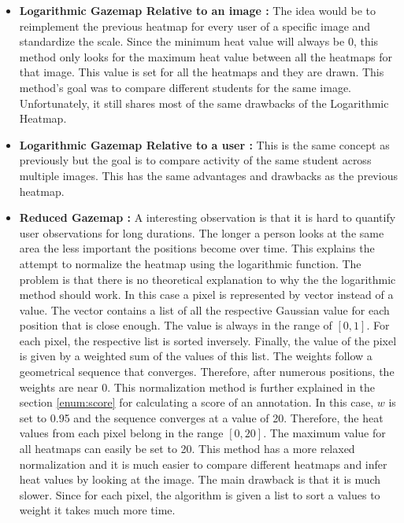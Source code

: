 \documentclass[a4paper,11pt]{report}
\numberwithin{figure}{chapter} %
\begin{document}
\begin{itemize}
\begin{itemize}
            \item \textbf{Logarithmic Gazemap Relative to an image :} The idea would be to reimplement the previous heatmap for every user of a specific image and standardize the scale.
            Since the minimum heat value will always be 0, this method only looks for the maximum heat value between all the heatmaps for that image.
            This value is set for all the heatmaps and they are drawn. This method's goal was to compare different students for the same image.
            Unfortunately, it still shares most of the same drawbacks of the Logarithmic Heatmap.
            \item \textbf{Logarithmic Gazemap Relative to a user :} This is the same concept as previously but the goal is to compare activity of the same student across multiple images.
            This has the same advantages and drawbacks as the previous heatmap.
            \item \textbf{Reduced Gazemap :} A interesting observation is that it is hard to quantify user observations for long durations.
            The longer a person looks at the same area the less important the positions become over time.
            This explains the attempt to normalize the heatmap using the logarithmic function.
            The problem is that there is no theoretical explanation to why the the logarithmic method should work.
            In this case a pixel is represented by vector instead of a value.
            The vector contains a list of all the respective Gaussian value for each position that is close enough.
            The value is always in the range of $[0,1]$.
            For each pixel, the respective list is sorted inversely.
            Finally, the value of the pixel is given by a weighted sum of the values of this list.
            The weights follow a geometrical sequence that converges.
            Therefore, after numerous positions, the weights are near 0.
            This normalization method is further explained in the section \ref{enum:score} for calculating a score of an annotation.
            In this case, $w$ is set to 0.95 and the sequence converges at a value of 20.
            Therefore, the heat values from each pixel belong in the range $[0,20]$.
            The maximum value for all heatmaps can easily be set to 20.
            This method has a more relaxed normalization and it is much easier to compare different heatmaps and infer heat values by looking at the image.
            The main drawback is that it is much slower.
            Since for each pixel, the algorithm is given a list to sort a values to weight it takes much more time.

\end{itemize}
\end{itemize}
\end{document}
